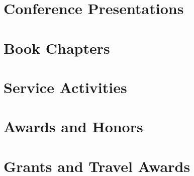 \documentclass[letterpaper,11pt]{article}
\begin{document}


\section{Conference Presentations}






\section{Book Chapters}



\nocite{*}


\section{Service Activities}



\section{Awards and Honors}



\section{Grants and Travel Awards}


\end{document}

